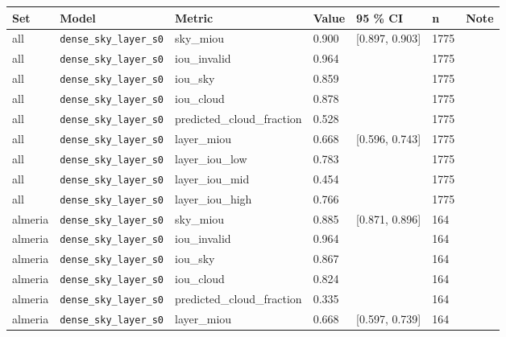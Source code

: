 \begin{center}{\scriptsize\setlength{\tabcolsep}{3pt}
\begin{tabular}{lllllll}
\toprule
Set & Model & Metric & Value & 95 \% CI & n & Note \\
\midrule
all & \texttt{dense\_\allowbreak{}sky\_\allowbreak{}layer\_\allowbreak{}s0} & sky\_miou & 0.900 & [0.897, 0.903] & 1775 &  \\
all & \texttt{dense\_\allowbreak{}sky\_\allowbreak{}layer\_\allowbreak{}s0} & iou\_invalid & 0.964 &  & 1775 &  \\
all & \texttt{dense\_\allowbreak{}sky\_\allowbreak{}layer\_\allowbreak{}s0} & iou\_sky & 0.859 &  & 1775 &  \\
all & \texttt{dense\_\allowbreak{}sky\_\allowbreak{}layer\_\allowbreak{}s0} & iou\_cloud & 0.878 &  & 1775 &  \\
all & \texttt{dense\_\allowbreak{}sky\_\allowbreak{}layer\_\allowbreak{}s0} & predicted\_cloud\_fraction & 0.528 &  & 1775 &  \\
all & \texttt{dense\_\allowbreak{}sky\_\allowbreak{}layer\_\allowbreak{}s0} & layer\_miou & 0.668 & [0.596, 0.743] & 1775 &  \\
all & \texttt{dense\_\allowbreak{}sky\_\allowbreak{}layer\_\allowbreak{}s0} & layer\_iou\_low & 0.783 &  & 1775 &  \\
all & \texttt{dense\_\allowbreak{}sky\_\allowbreak{}layer\_\allowbreak{}s0} & layer\_iou\_mid & 0.454 &  & 1775 &  \\
all & \texttt{dense\_\allowbreak{}sky\_\allowbreak{}layer\_\allowbreak{}s0} & layer\_iou\_high & 0.766 &  & 1775 &  \\
almeria & \texttt{dense\_\allowbreak{}sky\_\allowbreak{}layer\_\allowbreak{}s0} & sky\_miou & 0.885 & [0.871, 0.896] & 164 &  \\
almeria & \texttt{dense\_\allowbreak{}sky\_\allowbreak{}layer\_\allowbreak{}s0} & iou\_invalid & 0.964 &  & 164 &  \\
almeria & \texttt{dense\_\allowbreak{}sky\_\allowbreak{}layer\_\allowbreak{}s0} & iou\_sky & 0.867 &  & 164 &  \\
almeria & \texttt{dense\_\allowbreak{}sky\_\allowbreak{}layer\_\allowbreak{}s0} & iou\_cloud & 0.824 &  & 164 &  \\
almeria & \texttt{dense\_\allowbreak{}sky\_\allowbreak{}layer\_\allowbreak{}s0} & predicted\_cloud\_fraction & 0.335 &  & 164 &  \\
almeria & \texttt{dense\_\allowbreak{}sky\_\allowbreak{}layer\_\allowbreak{}s0} & layer\_miou & 0.668 & [0.597, 0.739] & 164 &  \\

\end{tabular}}
\end{center}
